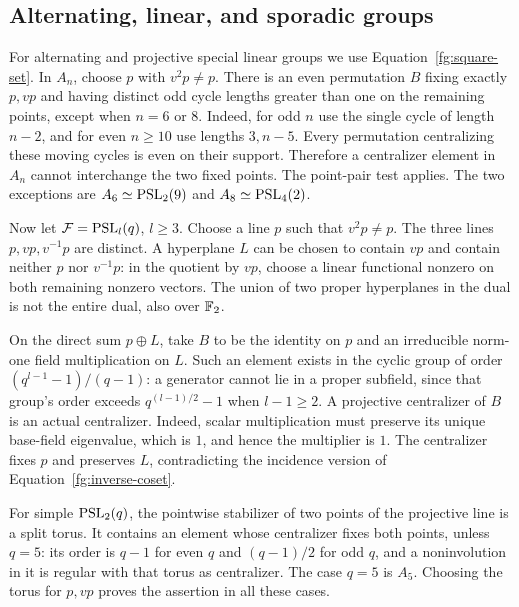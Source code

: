 \subsection{Alternating, linear, and sporadic groups}

For alternating and projective special linear groups we use
Equation~\eqref{fg:square-set}. In $A_n$, choose $p$ with
$v^2p\ne p$. There is an even permutation $B$ fixing exactly $p,vp$
and having distinct odd cycle lengths greater than one on the remaining
points, except when $n=6$ or $8$. Indeed, for odd $n$ use the single
cycle of length $n-2$, and for even $n\ge10$ use lengths $3,n-5$.
Every permutation centralizing these moving cycles is even on their
support. Therefore a centralizer element in $A_n$ cannot interchange the
two fixed points. The point-pair test applies. The two exceptions are
$A_6\simeq\operatorname{PSL}_2(9)$ and $A_8\simeq\operatorname{PSL}_4(2)$.

Now let $\mathcal F=\operatorname{PSL}_l(q)$, $l\ge3$. Choose a line $p$ such that
$v^2p\ne p$. The three lines $p,vp,v^{-1}p$ are distinct. A hyperplane
$L$ can be chosen to contain $vp$ and contain neither $p$ nor $v^{-1}p$:
in the quotient by $vp$, choose a linear functional nonzero on both
remaining nonzero vectors. The union of two proper hyperplanes in the
dual is not the entire dual, also over $\mathbb F_2$.

On the direct sum $p\oplus L$, take $B$ to be the identity on $p$ and
an irreducible norm-one field multiplication on $L$. Such an element
exists in the cyclic group of order $(q^{l-1}-1)/(q-1)$: a generator
cannot lie in a proper subfield, since that group's order exceeds
$q^{(l-1)/2}-1$ when $l-1\ge2$. A projective centralizer of $B$ is an
actual centralizer. Indeed, scalar multiplication must preserve its
unique base-field eigenvalue, which is $1$, and hence the multiplier is
$1$. The centralizer fixes $p$ and preserves $L$, contradicting the
incidence version of Equation~\eqref{fg:inverse-coset}.

For simple $\operatorname{PSL}_2(q)$, the pointwise stabilizer of two points of the
projective line is a split torus. It contains an element whose
centralizer fixes both points, unless $q=5$: its order is $q-1$ for
even $q$ and $(q-1)/2$ for odd $q$, and a noninvolution in it is regular
with that torus as centralizer. The case $q=5$ is $A_5$. Choosing the
torus for $p,vp$ proves the assertion in all these cases.


